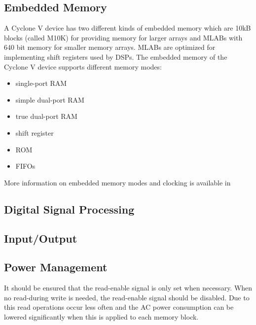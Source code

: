 \subsection{Embedded Memory}
\label{chap:embmem}
A Cyclone V device has two different kinds of embedded memory which are 10kB blocks (called M10K) for providing memory for larger arrays and MLABs with 640 bit memory for smaller memory arrays. MLABs are optimized for implementing shift registers used by DSPs. The embedded memory of the Cyclone V device supports different memory modes:
\begin{itemize}
\item single-port RAM\\
\item simple dual-port RAM\\
\item true dual-port RAM\\
\item shift register\\
\item ROM\\
\item FIFOs\\
\end{itemize}
More information on embedded memory modes and clocking is available in \cite[chapter 1]{AlteraFPGA15}
\subsection{Digital Signal Processing}
\subsection{Input/Output}
\subsection{Power Management}
It should be ensured that the read-enable signal is only set when necessary. When no read-during write is needed, the read-enable signal should be disabled. Due to this read operations occur less often and the AC power consumption can be lowered significantly when this is applied to each memory block.\cite[chapter 1]{AlteraFPGA15}

